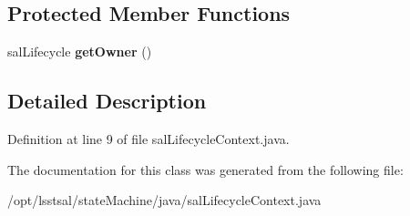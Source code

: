 \subsection*{Protected Member Functions}
\begin{DoxyCompactItemize}
\item 
\hypertarget{classsal_lifecycle_context_ad2f47a1d339cbe171ddb73213290b1e5}{sal\-Lifecycle {\bfseries get\-Owner} ()}\label{classsal_lifecycle_context_ad2f47a1d339cbe171ddb73213290b1e5}

\end{DoxyCompactItemize}


\subsection{Detailed Description}


Definition at line 9 of file sal\-Lifecycle\-Context.\-java.



The documentation for this class was generated from the following file\-:\begin{DoxyCompactItemize}
\item 
/opt/lsstsal/state\-Machine/java/sal\-Lifecycle\-Context.\-java\end{DoxyCompactItemize}
